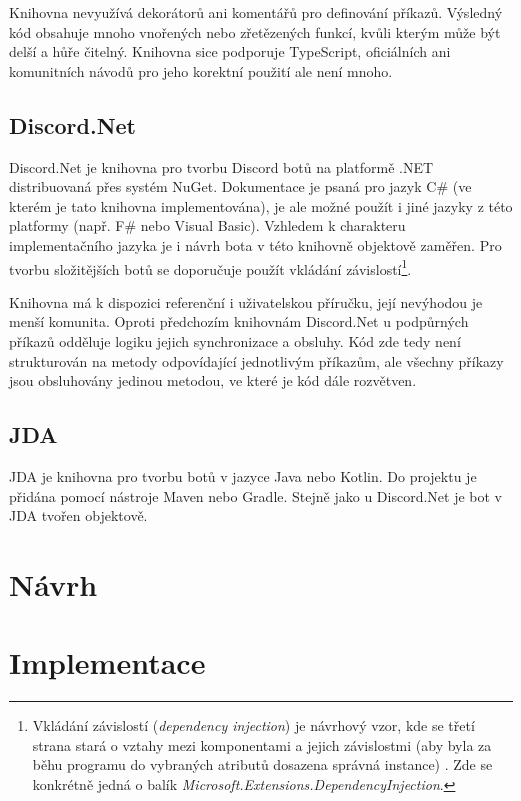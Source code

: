 \documentclass[FM]{tulthesis}
\begin{document}
	Knihovna nevyužívá dekorátorů ani komentářů pro definování příkazů. Výsledný kód obsahuje mnoho vnořených nebo zřetězených funkcí, kvůli kterým může být delší a hůře čitelný. Knihovna sice podporuje TypeScript, oficiálních ani komunitních návodů pro jeho korektní použití ale není mnoho.
	
	\subsection{Discord.Net}
	
	Discord.Net je knihovna pro tvorbu Discord botů na platformě .NET distribuovaná přes systém NuGet. Dokumentace je psaná pro jazyk C\# (ve kterém je tato knihovna implementována), je ale možné použít i jiné jazyky z této platformy (např. F\# nebo Visual Basic). Vzhledem k charakteru implementačního jazyka je i návrh bota v této knihovně objektově zaměřen. Pro tvorbu složitějších botů se doporučuje použít vkládání závislostí\footnote{Vkládání závislostí (\textit{dependency injection}) je návrhový vzor, kde se třetí strana stará o vztahy mezi komponentami a jejich závislostmi (aby byla za běhu programu do vybraných atributů dosazena správná instance) \cite{lit_distributedSystems}. Zde se konkrétně jedná o balík \textit{Microsoft.Extensions.DependencyInjection}.}.
	
	Knihovna má k dispozici referenční i uživatelskou příručku, její nevýhodou je menší komunita. Oproti předchozím knihovnám Discord.Net u podpůrných příkazů odděluje logiku jejich synchronizace a obsluhy. Kód zde tedy není strukturován na metody odpovídající jednotlivým příkazům, ale všechny příkazy jsou obsluhovány jedinou metodou, ve které je kód dále rozvětven.
	
	\subsection{JDA}
	
	JDA je knihovna pro tvorbu botů v jazyce Java nebo Kotlin. Do projektu je přidána pomocí nástroje Maven nebo Gradle. Stejně jako u Discord.Net je bot v JDA tvořen objektově. %
	
	\section{Návrh}
	 
	
	\section{Implementace}
	
\end{document}
